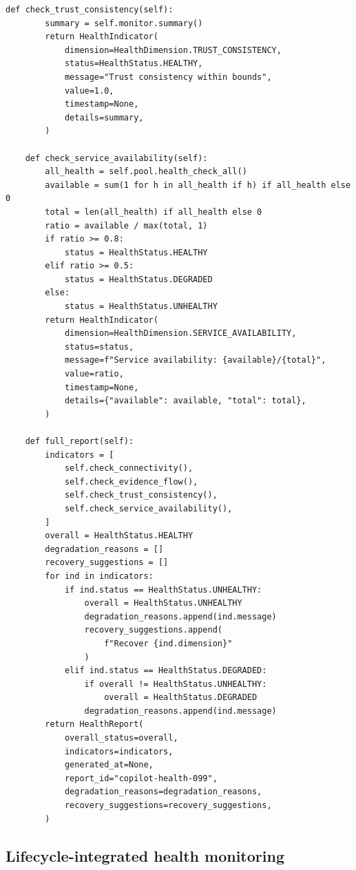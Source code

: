 \documentclass[11pt]{article}
\begin{document}
\begin{lstlisting}[style=jugeo-python,
  caption={Copilot health check producing HealthReport},
  label={lst:healthchk}]
    def check_trust_consistency(self):
        summary = self.monitor.summary()
        return HealthIndicator(
            dimension=HealthDimension.TRUST_CONSISTENCY,
            status=HealthStatus.HEALTHY,
            message="Trust consistency within bounds",
            value=1.0,
            timestamp=None,
            details=summary,
        )

    def check_service_availability(self):
        all_health = self.pool.health_check_all()
        available = sum(1 for h in all_health if h) if all_health else 0
        total = len(all_health) if all_health else 0
        ratio = available / max(total, 1)
        if ratio >= 0.8:
            status = HealthStatus.HEALTHY
        elif ratio >= 0.5:
            status = HealthStatus.DEGRADED
        else:
            status = HealthStatus.UNHEALTHY
        return HealthIndicator(
            dimension=HealthDimension.SERVICE_AVAILABILITY,
            status=status,
            message=f"Service availability: {available}/{total}",
            value=ratio,
            timestamp=None,
            details={"available": available, "total": total},
        )

    def full_report(self):
        indicators = [
            self.check_connectivity(),
            self.check_evidence_flow(),
            self.check_trust_consistency(),
            self.check_service_availability(),
        ]
        overall = HealthStatus.HEALTHY
        degradation_reasons = []
        recovery_suggestions = []
        for ind in indicators:
            if ind.status == HealthStatus.UNHEALTHY:
                overall = HealthStatus.UNHEALTHY
                degradation_reasons.append(ind.message)
                recovery_suggestions.append(
                    f"Recover {ind.dimension}"
                )
            elif ind.status == HealthStatus.DEGRADED:
                if overall != HealthStatus.UNHEALTHY:
                    overall = HealthStatus.DEGRADED
                degradation_reasons.append(ind.message)
        return HealthReport(
            overall_status=overall,
            indicators=indicators,
            generated_at=None,
            report_id="copilot-health-099",
            degradation_reasons=degradation_reasons,
            recovery_suggestions=recovery_suggestions,
        )
\end{lstlisting}

\subsection{Lifecycle-integrated health monitoring}
\end{document}
